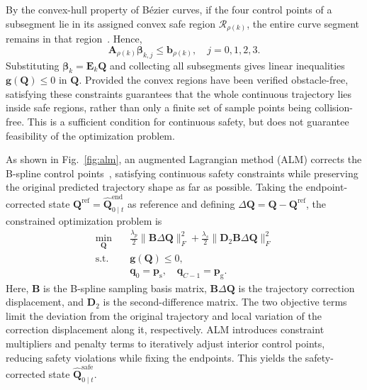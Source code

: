 \documentclass[journal]{IEEEtran}
\begin{document}
By the convex-hull property of B\'ezier curves, if the four control points of a
subsegment lie in its assigned convex safe region $\mathcal R_{\rho(k)}$, the
entire curve segment remains in that region~\cite{nurbs,nguyen}. Hence,
\begin{equation}
\mathbf A_{\rho(k)}\boldsymbol\beta_{k,j}\leq\mathbf b_{\rho(k)},
\quad j=0,1,2,3.
\end{equation}
Substituting $\boldsymbol\beta_k=\mathbf E_k\mathbf Q$ and collecting all
subsegments gives linear inequalities $\mathbf g(\mathbf Q)\leq0$ in
$\mathbf Q$. Provided the convex regions have been verified obstacle-free,
satisfying these constraints guarantees that the whole continuous trajectory
lies inside safe regions, rather than only a finite set of sample points
being collision-free. This is a sufficient condition for continuous safety,
but does not guarantee feasibility of the optimization problem.

As shown in Fig.~\ref{fig:alm}, an augmented Lagrangian method (ALM) corrects
the B-spline control points~\cite{hestenes,nocedal}, satisfying continuous
safety constraints while preserving the original predicted trajectory shape
as far as possible. Taking the endpoint-corrected state
$\mathbf Q^{\mathrm{ref}}=\widehat{\mathbf Q}_{0\mid t}^{\mathrm{end}}$ as
reference and defining $\Delta\mathbf Q=\mathbf Q-\mathbf Q^{\mathrm{ref}}$,
the constrained optimization problem is
\begin{equation}
\begin{aligned}
\min_{\mathbf Q}\quad &\frac{\lambda_p}{2}\lVert\mathbf B\Delta\mathbf Q\rVert_F^2
+\frac{\lambda_s}{2}\lVert\mathbf D_2\mathbf B\Delta\mathbf Q\rVert_F^2\\
\mathrm{s.t.}\quad &\mathbf g(\mathbf Q)\leq0,\\
&\mathbf q_0=\mathbf p_{\mathrm s},\quad \mathbf q_{C-1}=\mathbf p_{\mathrm g}.
\end{aligned}
\end{equation}
Here, $\mathbf B$ is the B-spline sampling basis matrix,
$\mathbf B\Delta\mathbf Q$ is the trajectory correction displacement, and
$\mathbf D_2$ is the second-difference matrix. The two objective terms limit
the deviation from the original trajectory and local variation of the
correction displacement along it, respectively. ALM introduces constraint
multipliers and penalty terms to iteratively adjust interior control points,
reducing safety violations while fixing the endpoints. This yields the
safety-corrected state $\widehat{\mathbf Q}_{0\mid t}^{\mathrm{safe}}$.
\end{document}
